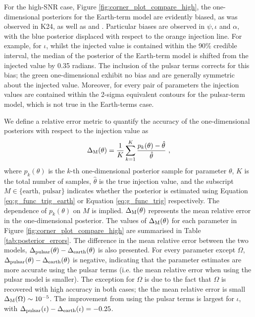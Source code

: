 \documentclass[fleqn,usenatbib,useAMS]{mnras}
\begin{document}
For the high-SNR case, Figure \ref{fig:corner_plot_compare_high}, the one-dimensional posteriors for the Earth-term model are evidently biased, as was observed in K24, as well as \cite{Zhupulsarterms} and \cite{Chen2022}. Particular biases are observed in $\psi, \iota $ and $\alpha$, with the blue posterior displaced with respect to the orange injection line. For example, for $\iota$, whilst the injected value is contained within the 90\% credible interval, the median of the posterior of the Earth-term model is shifted from the injected value by 0.35 radians. The inclusion of the pulsar terms corrects for this bias; the green one-dimensional exhibit no bias and are generally symmetric about the injected value. Moreover, for every pair of parameters the injection values are contained within the 2-sigma equivalent contours for the pulsar-term model, which is not true in the Earth-terms case. \newline 


We define a relative error metric to quantify the accuracy of the one-dimensional posteriors with respect to the injection value as
\begin{equation}
\Delta_{\rm M}(\theta) = \frac{1}{K}\sum_{k=1}^{K} \frac{p_k(\theta) - \hat{\theta}}{\hat{\theta}} \ , \label{eq:mean_rel_error}
\end{equation}
where $p_k(\theta)$ is the $k$-th one-dimensional posterior sample for parameter $\theta$, $K$ is the total number of samples, $\hat{\theta}$ is the true injection value, and the subscript $M \in \{ \text{earth, pulsar} \}$ indicates whether the posterior is estimated using Equation \eqref{eq:g_func_trig_earth} or Equation \eqref{eq:g_func_trig} respectively. The dependence of $p_k(\theta)$ on $M$ is implied. $\Delta_{\rm M}(\theta)$ represents the mean relative error in the one-dimensional posterior. The values of $\Delta_{\rm M}(\theta)$ for each parameter in Figure \ref{fig:corner_plot_compare_high} are summarised in Table \ref{tab:posterior_errors}. The difference in the mean relative error between the two models, $\Delta_{\rm pulsar}(\theta) - \Delta_{\rm earth}(\theta)$ is also presented. For every parameter except $\Omega$, $\Delta_{\rm pulsar}(\theta) - \Delta_{\rm earth}(\theta)$ is negative, indicating that the parameter estimates are more accurate using the pulsar terms (i.e. the mean relative error when using the pulsar model is smaller). The exception for $\Omega$ is due to the fact that $\Omega$ is recovered with high accuracy in both cases; the the mean relative error is small $\Delta_{\rm M}(\Omega) \sim 10^{-5}$. The improvement from using the pulsar terms is largest for $\iota$, with $\Delta_{\rm pulsar}(\iota) - \Delta_{\rm earth}(\iota) = -0.25$. \newline 
		
\end{document}
